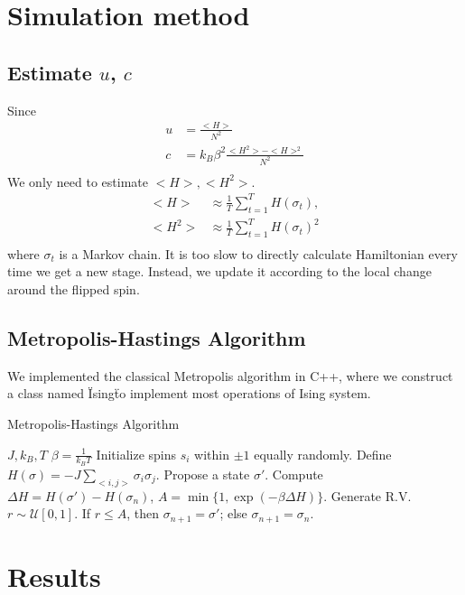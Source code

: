 \documentclass[conference,onecolumn,12pt]{IEEEtran}
\numberwithin{equation}{section}
\numberwithin{figure}{section}
\numberwithin{table}{section}
\theoremstyle{definition}
\begin{document}
\section{Simulation method}
\subsection{Estimate $u$, $c$}
Since 
\begin{equation}
\begin{split}
u &= \frac{<H>}{N^2}\\
c &= k_B\beta^2\frac{<H^2>-<H>^2}{N^2}\\
\end{split}
\end{equation}
We only need to estimate $<H>, <H^2>$.
\begin{equation}
\begin{split}
        <H> &\approx \frac{1}{T}\sum_{t=1}^TH(\sigma_t), \\
        <H^2> &\approx \frac{1}{T}\sum_{t=1}^TH(\sigma_t)^2\\
\end{split}
\end{equation}
where $\sigma_t$ is a Markov chain. It is too slow to directly calculate Hamiltonian every time we get a new stage. Instead, we update it according to the local change around the flipped spin. 
\subsection{Metropolis-Hastings Algorithm}
We implemented the classical Metropolis algorithm in C++, where we construct a class named \"Ising\" to implement most operations of Ising system.
\begin{algorithm}[H]
	\caption{Metropolis-Hastings Algorithm}
	\begin{algorithmic}[1]
		\Require $J, k_B, T$
		\State $\beta = \frac{1}{k_B T}$
		\State Initialize spins $s_i$ within $\pm 1$ equally randomly. 
		\State Define $H(\sigma) = -J\sum_{<i, j>}{\sigma_i\sigma_j}$.
		\Repeat
		\State Propose a state $\sigma'$.
		\State Compute $\Delta H = H(\sigma') - H(\sigma_n)$, $A = \min\{1, \exp(-\beta\Delta H)\}$.
		\State Generate R.V. $r \sim \mathcal{U}[0, 1]$.
		\State If $r \leq A$, then $\sigma_{n+1} = \sigma'$; else $\sigma_{n+1} = \sigma_n$.
	\end{algorithmic}
\end{algorithm}


\section{Results}
\end{document}
